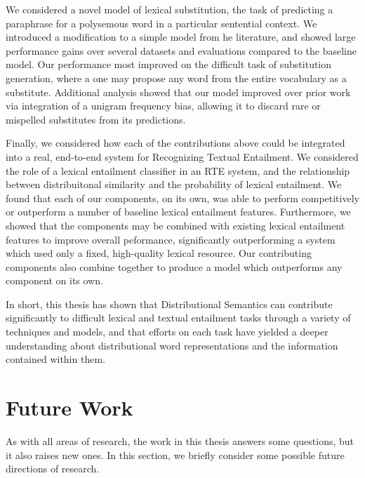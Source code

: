 We considered a novel model of lexical substitution, the task of predicting
a paraphrase for a polysemous word in a particular sentential context. We introduced
a modification to a simple model from he literature, and showed
large performance gains over several datasets and evaluations compared to the
baseline model. Our performance most improved on the difficult task of
substitution generation, where a one may propose any word from the entire
vocabulary as a substitute. Additional analysis showed that our model improved
over prior work via integration of a unigram frequency bias, allowing
it to discard rare or mispelled substitutes from its predictions.

Finally, we considered how each of the contributions above could be integrated
into a real, end-to-end system for Recognizing Textual Entailment. We considered
the role of a lexical entailment classifier in an RTE system, and the
relationship between distribuitonal similarity and the probability of lexical
entailment. We found that each of our components, on its own, was able to
perform competitively or outperform a number of baseline lexical entailment
features. Furthermore, we showed that the components may be combined with
existing lexical entailment features to improve overall peformance,
significantly outperforming a system which used only a fixed, high-quality
lexical resource. Our contributing components also combine together to produce
a model which outperforms any component on its own.

In short, this thesis has shown that Distributional Semantics can contribute
significantly to difficult lexical and textual entailment tasks through a
variety of techniques and models, and that efforts on each task have yielded
a deeper understanding about distributional word representations and the
information contained within them.


\section{Future Work}

As with all areas of research, the work in this thesis answers some questions,
but it also raises new ones. In this section, we briefly consider some possible
future directions of research.

